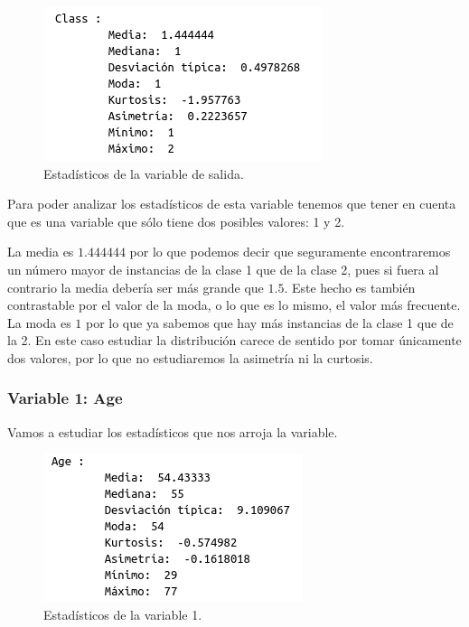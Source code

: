 \documentclass[12pt,a4paper]{article}
\begin{document}
\begin{figure}[H]
	\centering
	\includegraphics[scale=0.7]{./Imagenes/EDA/Clasificacion/estadisticos_class.png}
	\caption{Estadísticos de la variable de salida.}
\end{figure}

Para poder analizar los estadísticos de esta variable tenemos que tener en cuenta que es una variable que sólo tiene dos posibles valores: 1 y 2. 

La media es $1.444444$ por lo que podemos decir que seguramente encontraremos un número mayor de instancias de la clase 1 que de la clase 2, pues si fuera al contrario la media debería ser más grande que $1.5$. Este hecho es también contrastable por el valor de la moda, o lo que es lo mismo, el valor más frecuente. La moda es $1$ por lo que ya sabemos que hay más instancias de la clase 1 que de la 2. En este caso estudiar la distribución carece de sentido por tomar únicamente dos valores, por lo que no estudiaremos la asimetría ni la curtosis.

\subsubsection*{Variable 1: Age}

Vamos a estudiar los estadísticos que nos arroja la variable.

\begin{figure}[H]
	\centering
	\includegraphics[scale=0.7]{./Imagenes/EDA/Clasificacion/estadisticos_variable1.png}
	\caption{Estadísticos de la variable 1.}
\end{figure}
\end{document}
